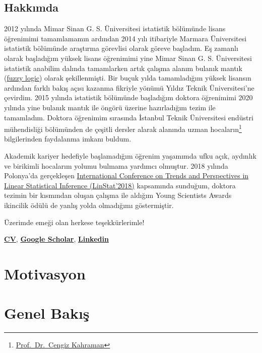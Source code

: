 \documentclass[
]{book}
\begin{document}
\hypertarget{hakkux131mda}{%
\section{Hakkımda}\label{hakkux131mda}}

2012 yılında Mimar Sinan G. S. Üniversitesi istatistik bölümünde lisans öğrenimimi tamamlamamın ardından 2014 yılı itibariyle Marmara Üniversitesi istatistik bölümünde araştırma görevlisi olarak göreve başladım. Eş zamanlı olarak başladığım yüksek lisans öğrenimimi yine Mimar Sinan G. S. Üniversitesi istatistik anabilim dalında tamamlarken artık çalışma alanım bulanık mantık (\href{https://en.wikipedia.org/wiki/Fuzzy_logic}{fuzzy logic}) olarak şekillenmişti. Bir buçuk yılda tamamladığım yüksek lisansın ardından farklı bakış açısı kazanma fikriyle yönümü Yıldız Teknik Üniversitesi'ne çevirdim. 2015 yılında istatistik bölümünde başladığım doktora öğrenimimi 2020 yılında yine bulanık mantık ile öngörü üzerine hazırladığım tezim ile tamamladım. Doktora öğrenimim sırasında İstanbul Teknik Üniversitesi endüstri mühendisliği bölümünden de çeşitli dersler alarak alanında uzman hocaların\footnote{\href{http://akademi.itu.edu.tr/kahramanc/}{Prof.~Dr.~Cengiz Kahraman}} bilgilerinden faydalanma imkanı buldum.

Akademik kariyer hedefiyle başlamadığım öğrenim yaşamımda ufku açık, aydınlık ve birikimli hocalarım yolumu bulmama yardımcı olmuştur. 2018 yılında Polonya'da gerçekleşen \href{http://www.linstat2018.put.poznan.pl/ysa.html}{International Conference on Trends and Perspectives in Linear Statistical Inference (LinStat'2018)} kapsamında sunduğum, doktora tezimin bir kısmından oluşan çalışma ile aldığım Young Scientists Awards ikincilik ödülü de yanlış yolda olmadığımı göstermiştir.

Üzerimde emeği olan herkese teşekkürlerimle!

\href{https://avesis.marmara.edu.tr/busenur.sarica}{\textbf{CV}}, \href{https://scholar.google.com.tr/citations?user=OKlYJEgAAAAJ\&hl=tr}{\textbf{Google Scholar}}, \href{https://www.linkedin.com/in/busenur-kızılaslan-795ab54a}{\textbf{Linkedin}}

\hypertarget{motivasyon}{%
\chapter{Motivasyon}\label{motivasyon}}

\hypertarget{genel-bakux131ux15f}{%
\chapter{Genel Bakış}\label{genel-bakux131ux15f}}
\end{document}
